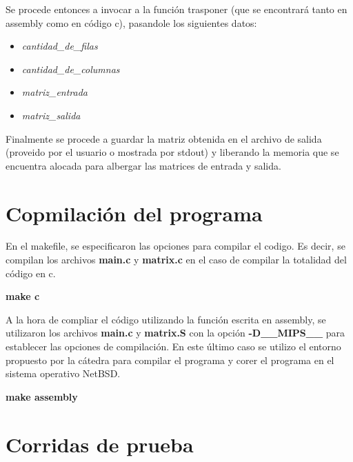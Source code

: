 \documentclass[11pt,a4paper]{article}
\begin{document}
Se procede entonces a invocar a la funci\'on trasponer (que se encontrar\'a tanto en assembly como en c\'odigo c), pasandole los siguientes datos:\\

\begin{itemize}
\item \textit{cantidad\_de\_filas}
\item \textit{cantidad\_de\_columnas}
\item \textit{matriz\_entrada}
\item \textit{matriz\_salida}
\end{itemize}

Finalmente se procede a guardar la matriz obtenida en el archivo de salida (proveido por el usuario o mostrada por stdout) y liberando la memoria que se encuentra alocada para albergar las matrices de entrada y salida.


\section{Copmilaci\'on del programa}

En el makefile, se especificaron las opciones para compilar el codigo. Es decir, se compilan los archivos \textbf{main.c} y \textbf{matrix.c} en el caso de compilar la totalidad del c\'odigo en c. 

\begin{center}
\textbf{make c}
\end{center}

A la hora de compliar el c\'odigo utilizando la funci\'on escrita en assembly, se utilizaron los archivos \textbf{main.c} y \textbf{matrix.S} con la opci\'on \textbf{-D\_\_MIPS\_\_} para establecer las opciones de compilaci\'on. En este \'ultimo caso se utilizo el entorno propuesto por la c\'atedra para compilar el programa y corer el programa en el sistema operativo NetBSD.\\

\begin{center}
\textbf{make assembly}
\end{center}

\section{Corridas de prueba}
\end{document}
